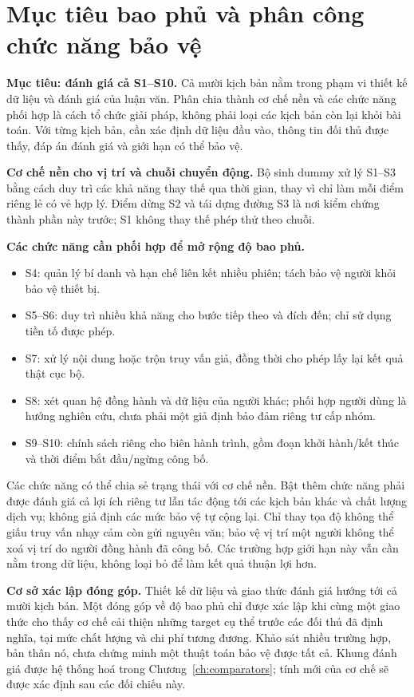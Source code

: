 \documentclass[12pt,a4paper,oneside]{report}
\begin{document}
\section{Mục tiêu bao phủ và phân công chức năng bảo vệ}
\label{sec:functional-modules}

\noindent\textbf{Mục tiêu: đánh giá cả S1--S10.}
Cả mười kịch bản nằm trong phạm vi thiết kế dữ liệu và đánh giá của luận văn. Phân chia thành cơ chế nền và các chức năng phối hợp là cách tổ chức giải pháp, không phải loại các kịch bản còn lại khỏi bài toán. Với từng kịch bản, cần xác định dữ liệu đầu vào, thông tin đối thủ được thấy, đáp án đánh giá và giới hạn có thể bảo vệ.

\noindent\textbf{Cơ chế nền cho vị trí và chuỗi chuyển động.}
Bộ sinh dummy xử lý S1--S3 bằng cách duy trì các khả năng thay thế qua thời gian, thay vì chỉ làm mỗi điểm riêng lẻ có vẻ hợp lý. Điểm dừng S2 và tái dựng đường S3 là nơi kiểm chứng thành phần này trước; S1 không thay thế phép thử theo chuỗi.

\noindent\textbf{Các chức năng cần phối hợp để mở rộng độ bao phủ.}
\begin{itemize}
  \item S4: quản lý bí danh và hạn chế liên kết nhiều phiên; tách bảo vệ người khỏi bảo vệ thiết bị.
  \item S5--S6: duy trì nhiều khả năng cho bước tiếp theo và đích đến; chỉ sử dụng tiền tố được phép.
  \item S7: xử lý nội dung hoặc trộn truy vấn giả, đồng thời cho phép lấy lại kết quả thật cục bộ.
  \item S8: xét quan hệ đồng hành và dữ liệu của người khác; phối hợp người dùng là hướng nghiên cứu, chưa phải một giả định bảo đảm riêng tư cấp nhóm.
  \item S9--S10: chính sách riêng cho biên hành trình, gồm đoạn khởi hành/kết thúc và thời điểm bắt đầu/ngừng công bố.
\end{itemize}

Các chức năng có thể chia sẻ trạng thái với cơ chế nền. Bật thêm chức năng phải được đánh giá cả lợi ích riêng tư lẫn tác động tới các kịch bản khác và chất lượng dịch vụ; không giả định các mức bảo vệ tự cộng lại. Chỉ thay tọa độ không thể giấu truy vấn nhạy cảm còn gửi nguyên văn; bảo vệ vị trí một người không thể xoá vị trí do người đồng hành đã công bố. Các trường hợp giới hạn này vẫn cần nằm trong dữ liệu, không loại bỏ để làm kết quả thuận lợi hơn.

\noindent\textbf{Cơ sở xác lập đóng góp.}
Thiết kế dữ liệu và giao thức đánh giá hướng tới cả mười kịch bản. Một đóng góp về độ bao phủ chỉ được xác lập khi cùng một giao thức cho thấy cơ chế cải thiện những target cụ thể trước các đối thủ đã định nghĩa, tại mức chất lượng và chi phí tương đương. Khảo sát nhiều trường hợp, bản thân nó, chưa chứng minh một thuật toán bảo vệ được tất cả. Khung đánh giá được hệ thống hoá trong Chương~\ref{ch:comparators}; tính mới của cơ chế sẽ được xác định sau các đối chiếu này.
\end{document}
